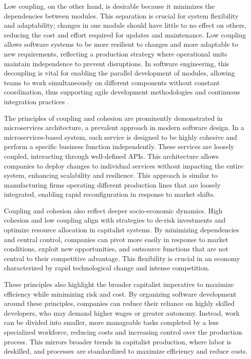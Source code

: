 \begin{refsection}
Low coupling, on the other hand, is desirable because it minimizes the dependencies between modules. This separation is crucial for system flexibility and adaptability; changes in one module should have little to no effect on others, reducing the cost and effort required for updates and maintenance. Low coupling allows software systems to be more resilient to changes and more adaptable to new requirements, reflecting a production strategy where operational units maintain independence to prevent disruptions. In software engineering, this decoupling is vital for enabling the parallel development of modules, allowing teams to work simultaneously on different components without constant coordination, thus supporting agile development methodologies and continuous integration practices \cite[pp.~134-137]{Pressman2019}.

The principles of coupling and cohesion are prominently demonstrated in microservices architecture, a prevalent approach in modern software design. In a microservices-based system, each service is designed to be highly cohesive and perform a specific business function independently. These services are loosely coupled, interacting through well-defined APIs. This architecture allows companies to deploy changes to individual services without impacting the entire system, enhancing scalability and resilience. This approach is similar to manufacturing firms operating different production lines that are loosely integrated, enabling rapid reconfiguration in response to market shifts.

Coupling and cohesion also reflect deeper socio-economic dynamics. High cohesion and low coupling align with strategies to de-risk investments and optimize resource allocation in capitalist systems. By minimizing dependencies and central control, companies can pivot more easily in response to market conditions, exploit new opportunities, and outsource functions that are not central to their competitive advantage. This flexibility is crucial in an economy characterized by rapid technological change and intense competition.

These principles also highlight the broader capitalist imperative to maximize efficiency while minimizing risk and cost. By organizing software development around these principles, companies can reduce their reliance on highly skilled developers, who may demand higher wages or greater autonomy. Instead, work can be divided into smaller, more manageable tasks completed by a less specialized workforce, reducing costs and increasing control over the production process. This mirrors broader trends in capitalist production, where labor is deskilled, and processes are standardized to maximize efficiency and reduce costs.


\end{refsection}
